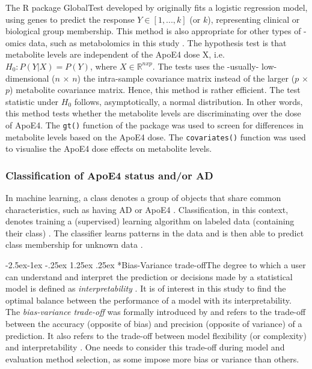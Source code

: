 \documentclass{amsart}
\makeatletter
\renewcommand\paragraph{\@startsection{paragraph}{4}{\z@}%
            {-2.5ex\@plus -1ex \@minus -.25ex}%
            {1.25ex \@plus .25ex}%
            {\normalfont\normalsize\bfseries}}
\makeatother
\begin{document}
The R package \textsf{GlobalTest} \cite{Goeman2004AOutcome, Goeman2006TestingAlternative, Goeman2023ThePackage} developed by \citeauthor{Goeman2004AOutcome} originally fits a logistic regression model, using genes to predict the response $Y \in [1,..., k]$ (or $k$), representing clinical or biological group membership. This method is also appropriate for other types of -omics data, such as metabolomics in this study \cite{Goeman2023ThePackage}.
The hypothesis test is that metabolite levels are independent of the ApoE4 dose X, i.e. $H_0 : P(Y|X) = P(Y)$, where $X \in \mathbb{R}^{n x p}$. The tests uses the -usually- low-dimensional ($n$ × $n$) the intra-sample covariance matrix instead of the larger ($p$ × $p$) metabolite covariance matrix. Hence, this method is rather efficient. The test statistic under $H_0$ follows, asymptotically, a normal distribution. In other words, this method tests whether the metabolite levels are discriminating over the dose of ApoE4. The \texttt{gt()} function of the package was used to screen for differences in metabolite levels based on the ApoE4 dose. The \texttt{covariates()} function was used to visualise the ApoE4 dose effects on metabolite levels.

\subsubsection{Classification of ApoE4 status and/or AD}
In machine learning, a class denotes a group of objects that share common characteristics, such as having AD or ApoE4 \cite*{Drummond2010}. Classification, in this context, denotes training a (supervised) learning algorithm on labeled data (containing their class) \cite*{Drummond2010}. The classifier learns patterns in the data and is then able to predict class membership for unknown data \cite*{Drummond2010}.

\paragraph*{Bias-Variance trade-off}The degree to which a user can understand and interpret the prediction or decisions made by a statistical model is defined as \textit{interpretability} \cite{Elshawi2019OnHypertension}. It is of interest in this study to find the optimal balance between the performance of a model with its interpretability. The \textit{bias-variance trade-off} was formally introduced by \citeauthor{Geman1992NeuralDilemma} and refers to the trade-off between the accuracy (opposite of bias) and precision (opposite of variance) of a prediction. It also refers to the trade-off between model flexibility (or complexity) and interpretability \cite{Geman1992NeuralDilemma}. One needs to consider this trade-off during model and evaluation method selection, as some impose more bias or variance than others.
\end{document}
